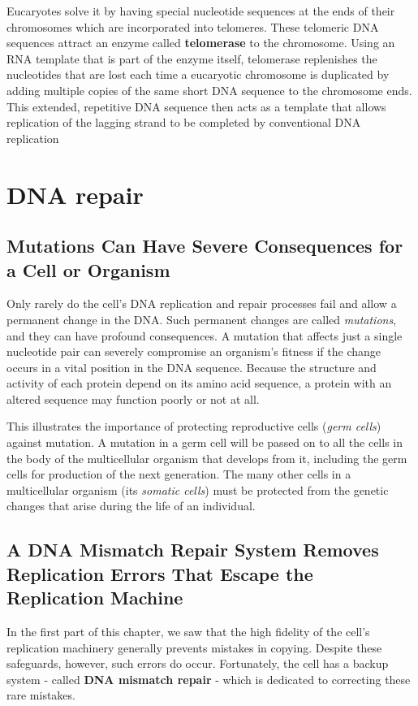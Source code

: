 Eucaryotes solve it by having special nucleotide
sequences at the ends of their chromosomes which are incorporated
into telomeres. These telomeric DNA sequences attract an enzyme called
\textbf{telomerase} to the chromosome. Using an RNA template that is part of
the enzyme itself, telomerase replenishes the nucleotides that are lost
each time a eucaryotic chromosome is duplicated by adding multiple
copies of the same short DNA sequence to the chromosome ends. This
extended, repetitive DNA sequence then acts as a template that allows
replication of the lagging strand to be completed by conventional DNA
replication


\section{DNA repair}

\subsection{Mutations Can Have Severe Consequences for a Cell or Organism}

Only rarely do the cell’s DNA replication and repair processes fail and
allow a permanent change in the DNA. Such permanent changes are
called \textit{mutations}, and they can have profound consequences. A mutation
that affects just a single nucleotide pair can severely compromise
an organism’s fitness if the change occurs in a vital position in the DNA
sequence. Because the structure and activity of each protein depend on
its amino acid sequence, a protein with an altered sequence may function
poorly or not at all.

This illustrates the importance of protecting reproductive cells (\textit{germ cells}) against
mutation. A mutation in a germ cell will be passed on to all the cells in
the body of the multicellular organism that develops from it, including the
germ cells for production of the next generation.
The many other cells in a multicellular organism (its \textit{somatic cells}) must
be protected from the genetic changes that arise during the life of an
individual.

\subsection{A DNA Mismatch Repair System Removes Replication Errors That Escape the Replication Machine}

In the first part of this chapter, we saw that the high fidelity of the cell’s
replication machinery generally prevents mistakes in copying. Despite
these safeguards, however, such errors do occur. Fortunately, the cell
has a backup system - called \textbf{DNA mismatch repair} - which is dedicated
to correcting these rare mistakes.

